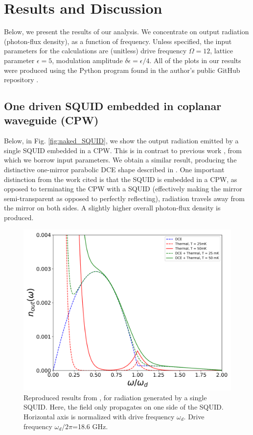 \chapter{Results and Discussion}\label{ch:results}

Below, we present the results of our analysis. We concentrate on output radiation (photon-flux density), as a function of frequency. Unless specified, the input parameters for the calculations are (unitless) drive frequency $\Omega= 12$, lattice parameter $\epsilon = 5$, modulation amplitude $\delta \epsilon = \epsilon/4$. All of the plots in our results were produced using the Python program found in the author's public GitHub repository \cite{Github_Repository}.

\section{One driven SQUID embedded in coplanar waveguide (CPW) }\label{sec:results_both_sides}
%
Below, in Fig. \ref{fig:naked_SQUID}, we show the output radiation emitted by a single SQUID embedded in a CPW. This is in contrast to previous work \cite{Johansson2009}, from which we borrow input parameters. We obtain a similar result, producing the distinctive one-mirror parabolic DCE shape described in \cite{Lambrecht1996}. One important distinction from the work cited is that the SQUID is embedded in a CPW, as opposed to terminating the CPW with a SQUID (effectively making the mirror semi-transparent as opposed to perfectly reflecting), radiation travels away from the mirror on both sides. A slightly higher overall photon-flux density is produced. 
%
%
%
\begin{figure}
    \includegraphics[width=\textwidth, keepaspectratio]{figures/results/reproduced_Johansson.png}
    \caption{Reproduced results from \protect\cite{Johansson2010}, for radiation generated by a single SQUID. Here, the field only propagates on one side of the SQUID. Horizontal axis is normalized with drive frequency $\omega_d$. Drive frequency $\omega_d / 2\pi$=18.6 GHz.}
    \label{fig:reproduced_Johansson_2}
\end{figure}
